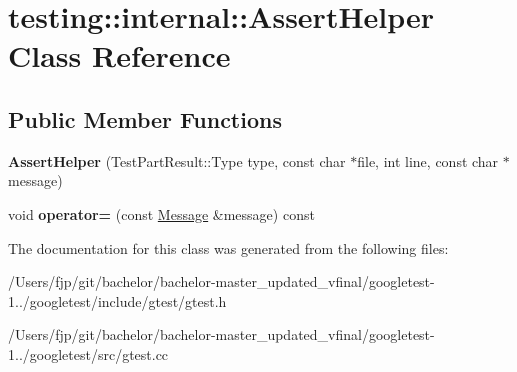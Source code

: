 \hypertarget{classtesting_1_1internal_1_1_assert_helper}{}\section{testing\+:\+:internal\+:\+:Assert\+Helper Class Reference}
\label{classtesting_1_1internal_1_1_assert_helper}
\subsection*{Public Member Functions}
\begin{DoxyCompactItemize}
\item 
\mbox{\label{classtesting_1_1internal_1_1_assert_helper_ac2c9334518fd4087189b4505567a3c90}} 
{\bfseries Assert\+Helper} (Test\+Part\+Result\+::\+Type type, const char $\ast$file, int line, const char $\ast$message)
\item 
\mbox{\label{classtesting_1_1internal_1_1_assert_helper_a97bf22d786131ab7baa86b97a27aeb4d}} 
void {\bfseries operator=} (const \mbox{\hyperlink{classtesting_1_1_message}{Message}} \&message) const
\end{DoxyCompactItemize}


The documentation for this class was generated from the following files\+:\begin{DoxyCompactItemize}
\item 
/\+Users/fjp/git/bachelor/bachelor-\/master\+\_\+updated\+\_\+vfinal/googletest-\/1../googletest/include/gtest/gtest.\+h\item 
/\+Users/fjp/git/bachelor/bachelor-\/master\+\_\+updated\+\_\+vfinal/googletest-\/1../googletest/src/gtest.\+cc\end{DoxyCompactItemize}

